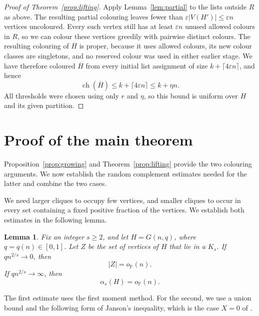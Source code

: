 \documentclass[11pt]{article}
\newtheorem{lemma}[theorem]{Lemma}
\numberwithin{equation}{section}
\newcommand{\ch}{\operatorname{ch}}
\newcommand{\op}{o_{\mathbb P}}
\newcommand{\ov}[1]{\overline{#1}}
\begin{document}
\begin{proof}[Proof of Theorem~\ref{prop:lifting}]
Apply Lemma~\ref{lem:partial} to the lists outside $R$ as above. The resulting partial colouring leaves fewer than $\varepsilon|V(H')|\le\varepsilon n$ vertices uncoloured. Every such vertex still has at least $\varepsilon n$ unused allowed colours in $R$, so we can colour these vertices greedily with pairwise distinct colours. The resulting colouring of $\ov H$ is proper, because it uses allowed colours, its new colour classes are singletons, and no reserved colour was used in either earlier stage. We have therefore coloured $\ov H$ from every initial list assignment of size $k+\lceil4\varepsilon n\rceil$, and hence
\[
 \ch(\ov H)\le k+\lceil4\varepsilon n\rceil\le k+\eta n.
\]
All thresholds were chosen using only $r$ and $\eta$, so this bound is uniform over $H$ and its given partition.
 
\end{proof}

\section{Proof of the main theorem}\label{sec:proof}

Proposition~\ref{prop:growing} and Theorem~\ref{prop:lifting} provide the two colouring arguments. We now establish the random complement estimates needed for the latter and combine the two cases.

We need larger cliques to occupy few vertices, and smaller cliques to occur in every set containing a fixed positive fraction of the vertices. We establish both estimates in the following lemma.

\begin{lemma}\label{lem:random-cliques}
Fix an integer $s\ge2$, and let $H=G(n,q)$, where $q=q(n)\in[0,1]$. Let $Z$ be the set of vertices of $H$ that lie in a $K_s$. If $qn^{2/s}\to0$, then
\begin{equation}\label{eq:rare-cliques}
 |Z|=\op(n).
\end{equation}
If $qn^{2/s}\to\infty$, then
\begin{equation}\label{eq:random-cliques}
 \alpha_s(H)=\op(n).
\end{equation}
\end{lemma}

The first estimate uses the first moment method. For the second, we use a union bound and the following form of Janson's inequality, which is the case $X=0$ of \cite[Theorem~2.14]{JLR}.
\end{document}
